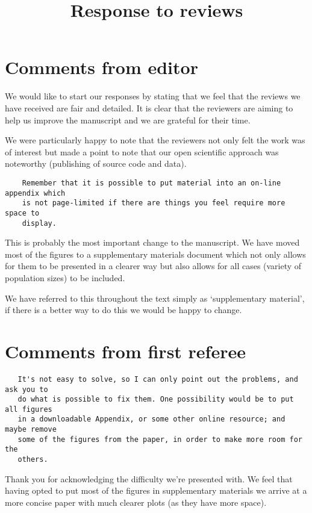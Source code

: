 \documentclass[a4]{article}
\title{Response to reviews}
\begin{document}
\maketitle

\section{Comments from editor}

We would like to start our responses by stating that we feel that the reviews we
have received are fair and detailed. It is clear that the reviewers are aiming
to help us improve the manuscript and we are grateful for their time.

We were particularly happy to note that the reviewers not only felt the work was
of interest but made a point to note that our open scientific approach was
noteworthy (publishing of source code and data).


\begin{verbatim}
    Remember that it is possible to put material into an on-line appendix which
    is not page-limited if there are things you feel require more space to
    display.
\end{verbatim}

This is probably the most important change to the manuscript. We have moved most
of the figures to a supplementary materials document which not only allows for
them to be presented in a clearer way but also allows for all cases (variety of
population sizes) to be included.

We have referred to this throughout the text simply as `supplementary material',
if there is a better way to do this we would be happy to change.

\section{Comments from first referee}

\begin{verbatim}
   It's not easy to solve, so I can only point out the problems, and ask you to
   do what is possible to fix them. One possibility would be to put all figures
   in a downloadable Appendix, or some other online resource; and maybe remove
   some of the figures from the paper, in order to make more room for the
   others.
\end{verbatim}

Thank you for acknowledging the difficulty we're presented with. We feel that
having opted to put most of the figures in supplementary materials we arrive at
a more concise paper with much clearer plots (as they have more space).
\end{document}
